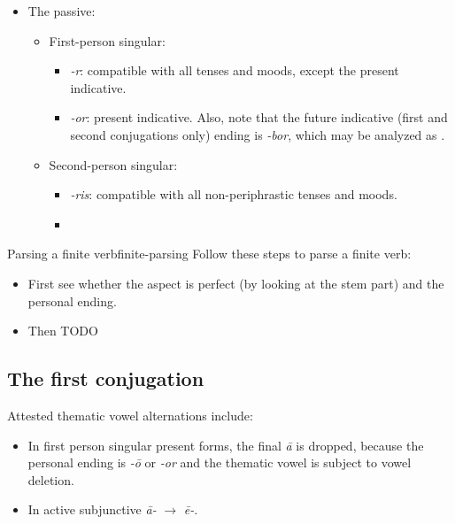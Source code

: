 \documentclass[a4paper, oneside]{report}
\newcommand{\form}[1]{\emph{#1}}
\begin{document}
\begin{itemize}
    \item The passive:
    \begin{itemize}
        \item First-person singular: 
        \begin{itemize}
            \item \form{-r}: compatible with all tenses and moods, except the present indicative.
            \item \form{-or}: present indicative.
            Also, note that the future indicative (first and second conjugations only) ending is \form{-bor},
            which may be analyzed as .
        \end{itemize}
        \item Second-person singular:
        \begin{itemize}
            \item \form{-ris}: compatible with all non-periphrastic tenses and moods.
            \item
        \end{itemize}
    \end{itemize}
\end{itemize}

\begin{infobox}{Parsing a finite verb}{finite-parsing}
    Follow these steps to parse a finite verb:
    \begin{itemize}
        \item First see whether the aspect is perfect (by looking at the stem part)
            and the personal ending.
        \item Then TODO 
    \end{itemize}
\end{infobox}

\subsection{The first conjugation}\label{sec:verb-morphology.1c}

Attested thematic vowel alternations include:
\begin{itemize}
    \item In first person singular present forms, 
    the final \form{\={a}} is dropped, 
    because the personal ending is \form{-\={o}} or \form{-or}
    and the thematic vowel is subject to vowel deletion.
    \item In active subjunctive  \form{\={a}-} $\to$ \form{\={e}-}.
\end{itemize}
\end{document}
